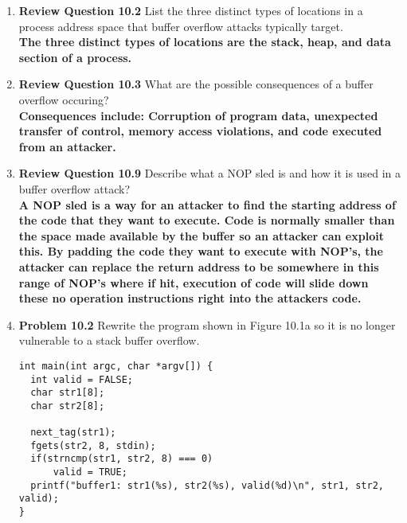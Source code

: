 \documentclass[12pt]{article}
\begin{document}
\renewcommand{\headrulewidth}{0.4pt}
\vspace{-3mm}
\begin{enumerate}
\item \textbf{Review Question 10.2} List the three distinct types of locations in a process address space that buffer overflow attacks typically target. \\

\textbf{The three distinct types of locations are the stack, heap, and data section of a process.}

\item \textbf{Review Question 10.3} What are the possible consequences of a buffer overflow occuring? \\

\textbf{Consequences include: Corruption of program data, unexpected transfer of control, memory access violations, and code executed from an attacker.}

\item \textbf{Review Question 10.9} Describe what a NOP sled is and how it is used in a buffer overflow attack? \\

\textbf{A NOP sled is a way for an attacker to find the starting address of the code that they want to execute. Code is normally smaller than the space made available by the buffer so an attacker can exploit this. By padding the code they want to execute with NOP's, the attacker can replace the return address to be somewhere in this range of NOP's where if hit, execution of code will slide down these no operation instructions right into the attackers code.}

\item \textbf{Problem 10.2} Rewrite the program shown in Figure 10.1a so it is no longer vulnerable to a stack buffer overflow. \\

\begin{lstlisting}
int main(int argc, char *argv[]) {
  int valid = FALSE;
  char str1[8];
  char str2[8];

  next_tag(str1);
  fgets(str2, 8, stdin);
  if(strncmp(str1, str2, 8) === 0)
      valid = TRUE;
  printf("buffer1: str1(%s), str2(%s), valid(%d)\n", str1, str2, valid);
}
\end{lstlisting}


\end{enumerate}
\end{document}
